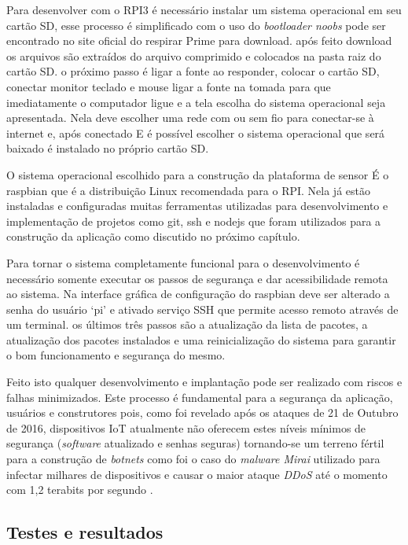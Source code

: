 Para desenvolver com o RPI3 é necessário instalar um sistema operacional
em seu cartão SD,  esse processo é simplificado com o uso do \emph{bootloader noobs}
pode ser encontrado no site oficial do respirar Prime  para download.  após
feito download os arquivos são extraídos do arquivo comprimido e colocados  na
pasta raiz do cartão SD.  o próximo passo é ligar a fonte ao responder,
colocar o cartão SD,  conectar monitor teclado e mouse ligar a fonte na tomada
para que imediatamente o computador ligue  e a tela escolha do sistema
operacional seja apresentada.    Nela deve escolher uma rede com ou sem fio para
conectar-se à internet e,  após conectado E é possível escolher o sistema
operacional que será baixado é instalado no próprio cartão SD.

O sistema operacional escolhido para a construção da plataforma de sensor É o
raspbian que é a distribuição Linux recomendada para o RPI. Nela já estão
instaladas e configuradas muitas ferramentas utilizadas para desenvolvimento e
implementação de projetos como git, ssh e nodejs que foram utilizados para a
construção da aplicação como discutido no próximo capítulo.

Para tornar o sistema completamente funcional para o desenvolvimento é
necessário somente executar os passos de segurança  e dar acessibilidade remota
ao sistema. Na interface gráfica de configuração do raspbian  deve ser alterado
a senha do usuário ‘pi’  e ativado serviço SSH que permite acesso remoto através
de um terminal.  os últimos três passos  são a atualização da lista de pacotes,
a atualização dos pacotes instalados e uma reinicialização do sistema  para
garantir o bom funcionamento e segurança do mesmo.

Feito isto qualquer desenvolvimento e implantação pode ser realizado com riscos
e falhas minimizados. Este processo é fundamental para a segurança da aplicação,
usuários e construtores pois, como foi revelado após os ataques de 21 de Outubro
de 2016, dispositivos IoT atualmente não oferecem estes níveis mínimos de
segurança (\emph{software} atualizado e senhas seguras) tornando-se um terreno
fértil para a construção de \emph{botnets} como foi o caso do \emph{malware
Mirai} utilizado para infectar milhares de dispositivos e causar o maior ataque
\emph{DDoS} até o momento com 1,2 terabits por segundo
\cite{guardianMirai} \cite{nytimesMirai}.


\subsection{Testes e resultados}
\label{subsec:testes-rpi}

